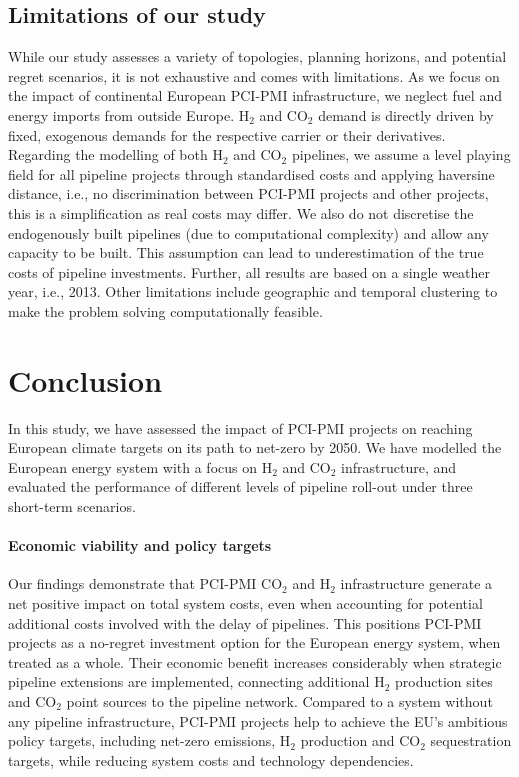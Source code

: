 \documentclass[pdflatex,sn-nature]{sn-jnl}%
\theoremstyle{thmstyleone}%
\theoremstyle{thmstyletwo}%
\theoremstyle{thmstylethree}%
\begin{document}
\subsection{Limitations of our study}\label{sec:limitations}
While our study assesses a variety of topologies, planning horizons, and potential regret scenarios, it is not exhaustive and comes with limitations. As we focus on the impact of continental European PCI-PMI infrastructure, we neglect fuel and energy imports from outside Europe. H$_2$ and CO$_2$ demand is directly driven by fixed, exogenous demands for the respective carrier or their derivatives.
Regarding the modelling of both H$_2$ and CO$_2$ pipelines, we assume a level playing field for all pipeline projects through standardised costs and applying haversine distance, i.e., no discrimination between PCI-PMI projects and other projects, this is a simplification as real costs may differ. We also do not discretise the endogenously built pipelines (due to computational complexity) and allow any capacity to be built. This assumption can lead to underestimation of the true costs of pipeline investments.
Further, all results are based on a single weather year, i.e., 2013.
Other limitations include geographic and temporal clustering to make the problem solving computationally feasible.

\section{Conclusion}
\label{sec:conclusion}

In this study, we have assessed the impact of PCI-PMI projects on reaching European climate targets on its path to net-zero by 2050. We have modelled the European energy system with a focus on H$_2$ and CO$_2$ infrastructure, and evaluated the performance of different levels of pipeline roll-out under three short-term scenarios. 

\paragraph{Economic viability and policy targets}
Our findings demonstrate that PCI-PMI CO$_2$ and H$_2$ infrastructure generate a net positive impact on total system costs, even when accounting for potential additional costs involved with the delay of pipelines. This positions PCI-PMI projects as a no-regret investment option for the European energy system, when treated as a whole.
Their economic benefit increases considerably when strategic pipeline extensions are implemented, connecting additional H$_2$ production sites and CO$_2$ point sources to the pipeline network. 
Compared to a system without any pipeline infrastructure, PCI-PMI projects help to achieve the EU's ambitious policy targets, including net-zero emissions, H$_2$ production and CO$_2$ sequestration targets, while reducing system costs and technology dependencies.
\end{document}
